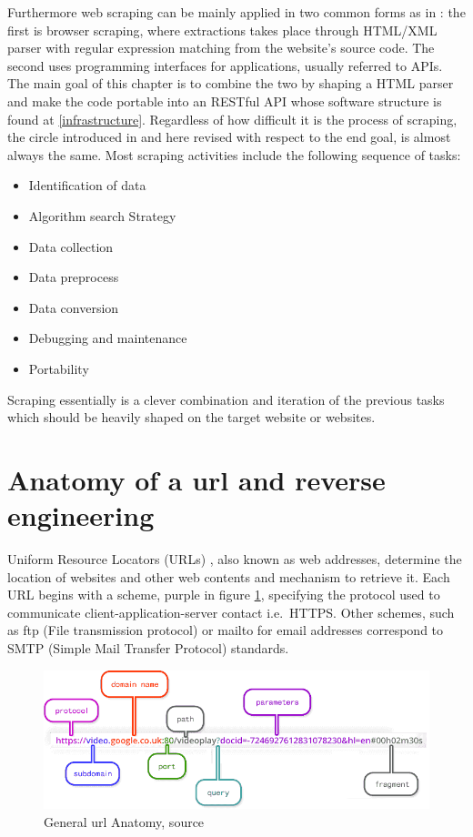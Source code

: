\documentclass[
  12pt,
  a4paper,
  oneside]{book}
\providecommand{\tightlist}{%
  \setlength{\itemsep}{0pt}\setlength{\parskip}{0pt}}
\theoremstyle{definition}
\theoremstyle{definition}
\theoremstyle{definition}
\theoremstyle{remark}
\begin{document}
Furthermore web scraping can be mainly applied in two common forms as in \citep{wsstatistics}: the first is browser scraping, where extractions takes place through HTML/XML parser with regular expression matching from the website's source code. The second uses programming interfaces for applications, usually referred to APIs. The main goal of this chapter is to combine the two by shaping a HTML parser and make the code portable into an RESTful API whose software structure is found at \ref{infrastructure}.
Regardless of how difficult it is the process of scraping, the circle introduced in \citet{automateddatacollection} and here revised with respect to the end goal, is almost always the same. Most scraping activities include the following sequence of tasks:

\begin{itemize}
\tightlist
\item
  Identification of data
\item
  Algorithm search Strategy
\item
  Data collection
\item
  Data preprocess
\item
  Data conversion
\item
  Debugging and maintenance
\item
  Portability
\end{itemize}

Scraping essentially is a clever combination and iteration of the previous tasks which should be heavily shaped on the target website or websites.

\hypertarget{anatomy-of-a-url-and-reverse-engineering}{%
\section{Anatomy of a url and reverse engineering}\label{anatomy-of-a-url-and-reverse-engineering}}

Uniform Resource Locators (URLs) \citep{wiki:url}, also known as web addresses, determine the location of websites and other web contents and mechanism to retrieve it.
Each URL begins with a scheme, purple in figure \ref{fig:urlanatomy}, specifying the protocol used to communicate client-application-server contact i.e.~HTTPS. Other schemes, such as ftp (File transmission protocol) or mailto for email addresses correspond to SMTP (Simple Mail Transfer Protocol) standards.

\begin{figure}
\centering
\includegraphics{images/complex_url.png}
\caption{\label{fig:urlanatomy}General url Anatomy, \citet{Anatomyo72} source}
\end{figure}
\end{document}
